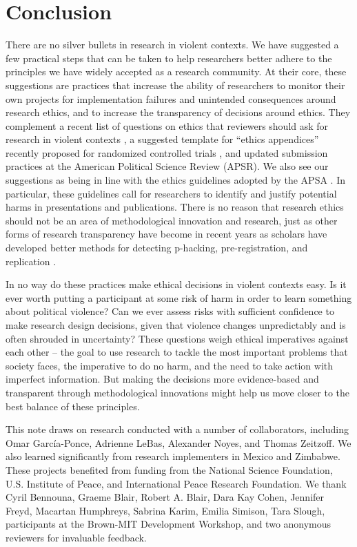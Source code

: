 \section{Conclusion}

There are no silver bullets in research in violent contexts. We have suggested a few practical steps that can be taken to help researchers better adhere to the principles we have widely accepted as a research community. At their core, these suggestions are practices that increase the ability of researchers to monitor their own projects for implementation failures and unintended consequences around research ethics, and to increase the transparency of decisions around ethics. They complement a recent list of questions on ethics that reviewers should ask for research in violent contexts \citep{cronin2018ethics}, a suggested template for ``ethics appendices'' recently proposed for randomized controlled trials \citep{asiedu2021call}, and updated submission practices at the American Political Science Review (APSR). We also see our suggestions as being in line with the ethics guidelines adopted by the APSA \citep{apsa2020ethics}. In particular, these guidelines call for researchers to identify and justify potential harms in presentations and publications. There is no reason that research ethics should not be an area of methodological innovation and research, just as other forms of research transparency have become in recent years as scholars have developed better methods for detecting p-hacking, pre-registration, and replication \citep{humphreys2013fishing, simonsohn2014p, open2015estimating}. 
 
In no way do these practices make ethical decisions in violent contexts easy. Is it ever worth putting a participant at some risk of harm in order to learn something about political violence? Can we ever assess risks with sufficient confidence to make research design decisions, given that violence changes unpredictably and is often shrouded in uncertainty? 
 These questions weigh ethical imperatives against each other -- the goal to use research to tackle the most important problems that society faces, the imperative to do no harm, and the need to take action with imperfect information. But making the decisions more evidence-based and transparent through methodological innovations might help us move closer to the best balance of these principles. 




\begin{acknowledgement}
This note draws on research conducted with a number of collaborators, including Omar Garc\'{i}a-Ponce, Adrienne LeBas, Alexander Noyes, and Thomas Zeitzoff. We also learned significantly from research implementers in Mexico and Zimbabwe. These projects benefited from funding from the National Science Foundation, U.S. Institute of Peace, and International Peace Research Foundation. We thank Cyril Bennouna, Graeme Blair, Robert A. Blair, Dara Kay Cohen, Jennifer Freyd, Macartan Humphreys, Sabrina Karim, Emilia Simison, Tara Slough, participants at the Brown-MIT Development Workshop, and two anonymous reviewers for invaluable feedback.
\end{acknowledgement}